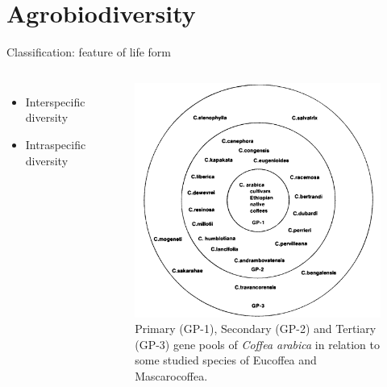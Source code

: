 \documentclass[
  ignorenonframetext,
  aspectratio=169]{beamer}
\providecommand{\tightlist}{%
  \setlength{\itemsep}{0pt}\setlength{\parskip}{0pt}}
\newcommand{\bcolumns}{\begin{columns}[T, onlytextwidth]}
\newcommand{\ecolumns}{\end{columns}}
\begin{document}
\hypertarget{agrobiodiversity}{%
\section{Agrobiodiversity}\label{agrobiodiversity}}

\begin{frame}{Classification: feature of life form}
\protect\hypertarget{classification-feature-of-life-form}{}
\bcolumns
{}

\begin{itemize}
\tightlist
\item
  Interspecific diversity
\item
  Intraspecific diversity
\end{itemize}


\begin{figure}
\includegraphics[width=0.85\linewidth]{../images/primary_secondary_tertiary_gene_pools_coffee} \caption{Primary (GP-1), Secondary (GP-2) and Tertiary (GP-3) gene pools of \textit{Coffea arabica} in relation to some studied species of Eucoffea and Mascarocoffea.}\label{fig:gene-pools-coffee}
\end{figure}

\ecolumns
\end{frame}
\end{document}
